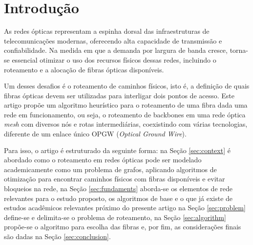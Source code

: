 \section{Introdução}

As redes ópticas representam a espinha dorsal das infraestruturas de
telecomunicações modernas, oferecendo alta capacidade de transmissão e
confiabilidade. Na medida em que a demanda por largura de banda cresce,
torna-se essencial otimizar o uso dos recursos físicos dessas redes, incluindo
o roteamento e a alocação de fibras ópticas disponíveis.

Um desses desafios é o roteamento de caminhos físicos, isto é, a definição de
quais fibras ópticas devem ser utilizadas para interligar dois pontos de
acesso. Este artigo propõe um algoritmo heurístico para o roteamento de uma
fibra dada uma rede em funcionamento, ou seja, o roteamento de backbones em uma
rede óptica \textit{mesh} com diversos nós e rotas intermediárias, coexistindo
com várias tecnologias, diferente de um enlace único OPGW (\textit{Optical
  Ground Wire}).

Para isso, o artigo é estruturado da seguinte forma: na Seção \ref{sec:context}
é abordado como o roteamento em redes ópticas pode ser modelado academicamente
como um problema de grafos, aplicando algoritmos de otimização para encontrar
caminhos físicos com fibras disponíveis e evitar bloqueios na rede, na Seção
\ref{sec:fundaments} aborda-se os elementos de rede relevantes para o estudo
proposto, os algoritmos de base e o que já existe de estudos acadêmicos
relevantes próximo do presente artigo na Seção \ref{sec:problem} define-se e
delimita-se o problema de roteamento, na Seção \ref{sec:algorithm} propõe-se o
algoritmo para escolha das fibras e, por fim, as considerações finais são dadas
na Seção \ref{sec:conclusion}.

